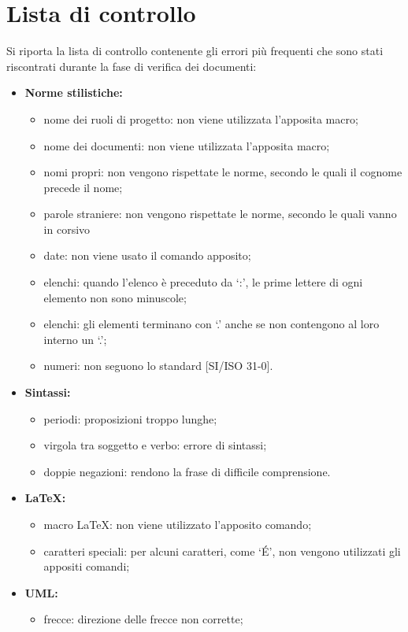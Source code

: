 \section{Lista di controllo}
Si riporta la lista di controllo contenente gli errori più frequenti che sono stati riscontrati durante la fase di verifica dei documenti:
\begin{itemize}
	\item \textbf{Norme stilistiche:}
	\begin{itemize}
		\item nome dei ruoli di progetto: non viene utilizzata l'apposita macro;
		\item nome dei documenti: non viene utilizzata l'apposita macro;
		\item nomi propri: non vengono rispettate le norme, secondo le quali il cognome precede il nome;
		\item parole straniere: non vengono rispettate le norme, secondo le quali vanno in corsivo
		\item date: non viene usato il comando apposito;
		\item elenchi: quando l'elenco è preceduto da ‘:’, le prime lettere di ogni elemento non sono minuscole;
		\item elenchi: gli elementi terminano con ‘.’ anche se non contengono al loro interno un ‘.’;
		\item numeri: non seguono lo standard [SI/ISO 31-0].
	\end{itemize}
	\item \textbf{Sintassi:}
	\begin{itemize}
		\item periodi: proposizioni troppo lunghe;
		\item virgola tra soggetto e verbo: errore di sintassi;
		\item doppie negazioni: rendono la frase di difficile comprensione.
	\end{itemize}
	\item \textbf{\LaTeX{}:}
	\begin{itemize}
		\item macro \LaTeX{}: non viene utilizzato l'apposito comando;
		\item caratteri speciali: per alcuni caratteri, come ‘\'{E}’, non vengono utilizzati gli appositi comandi;
	\end{itemize}
	\item \textbf{UML:}
	\begin{itemize}
		\item frecce: direzione delle frecce non corrette;

\end{itemize}
\end{itemize}
